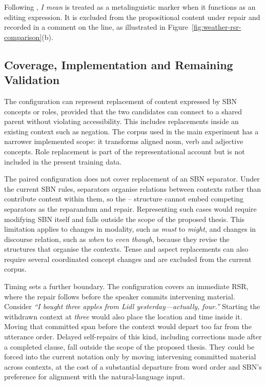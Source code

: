 \documentclass{article}
\begin{document}
Following \citet{maschlerMetalanguagingDiscourseMarkers1994},
\textit{I mean} is treated as a metalinguistic marker when it functions as an
editing expression. It is excluded from the propositional content under repair
and recorded in a \sbnterm{\%} comment on the  line, as
illustrated in Figure~\ref{fig:weather-rsr-comparison}(b).

\subsection{Coverage, Implementation and Remaining Validation}
\label{sec:formalism-coverage}

The configuration can represent replacement of content expressed by SBN
concepts or roles, provided that the two candidates can connect to a shared
parent without violating accessibility. This includes replacements inside an
existing context such as negation. The corpus used in the main experiment has
a narrower implemented scope: it transforms aligned noun, verb and adjective
concepts. Role replacement is part of the representational account but is not
included in the present training data.

The paired configuration does not cover replacement of an SBN separator.
Under the current SBN rules, separators organise relations between contexts
rather than contribute content within them, so the
-- structure cannot embed competing
separators as the reparandum and repair. Representing such cases would require
modifying SBN itself and falls outside the scope of the proposed thesis. This
limitation applies to changes in modality, such as \textit{must} to
\textit{might}, and changes in discourse relation, such as \textit{when} to
\textit{even though}, because they revise the structures that organise the
contexts. Tense and aspect replacements can also require several coordinated
concept changes and are excluded from the current corpus.

Timing sets a further boundary. The configuration covers an immediate RSR,
where the repair follows before the speaker commits intervening material.
Consider \textit{``I bought three apples from Lidl yesterday---actually,
four.''} Starting the withdrawn context at \textit{three} would also place the
location and time inside it. Moving that committed span before the context
would depart too far from the utterance order. Delayed self-repairs of this kind,
including corrections made after a completed clause, fall outside the scope of
the proposed thesis. They could be forced into the current notation only by
moving intervening committed material across contexts, at the cost of a
substantial departure from word order and SBN's preference for alignment with
the natural-language input.
\end{document}
